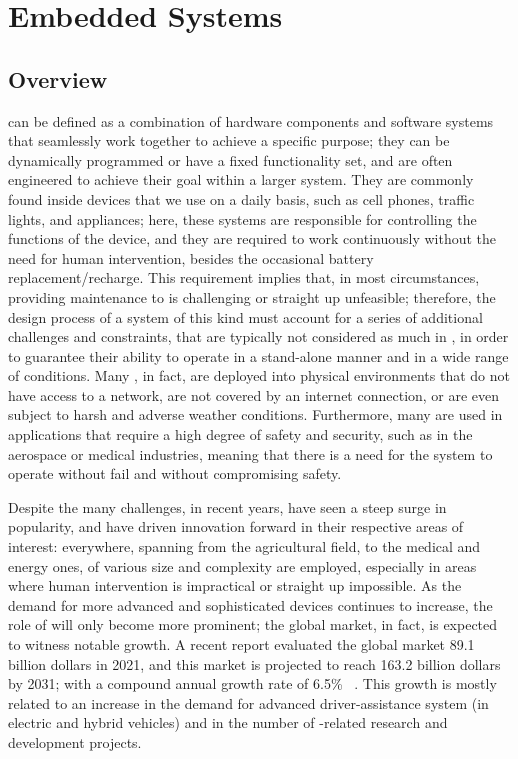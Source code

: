 \chapter{Embedded Systems}
\section{Overview}
\ess can be defined as a combination of hardware components and software systems that seamlessly work together to achieve a specific purpose; they can be dynamically programmed or have a fixed functionality set, and are often engineered to achieve their goal within a larger system. They are commonly found inside devices that we use on a daily basis, such as cell phones, traffic lights, and appliances; here, these systems are responsible for controlling the functions of the device, and they are required to work continuously without the need for human intervention, besides the occasional battery replacement/recharge.
This requirement implies that, in most circumstances, providing maintenance to \ess is challenging or straight up unfeasible; therefore, the design process of a system of this kind must account for a series of additional challenges and constraints, that are typically not considered as much in \noess, in order to guarantee their ability to operate in a stand-alone manner and in a wide range of conditions. Many \ess, in fact, are deployed into physical environments that do not have access to a network, are not covered by an internet connection, or are even subject to harsh and adverse weather conditions.
Furthermore, many \ess are used in applications that require a high degree of safety and security, such as in the aerospace or medical industries, meaning that there is a need for the system to operate without fail and without compromising safety. 

Despite the many challenges, in recent years, \ess have seen a steep surge in popularity, and have driven innovation forward in their respective areas of interest: everywhere, spanning from the agricultural field, to the medical and energy ones, \ess of various size and complexity are employed, especially in areas where human intervention is impractical or straight up impossible.
As the demand for more advanced and sophisticated devices continues to increase, the role of \ess will only become more prominent; the global \ess market, in fact, is expected to witness notable growth. A recent report evaluated the global \ess market 89.1 billion dollars in 2021, and this market is projected to reach 163.2 billion dollars by 2031; with a compound annual growth rate of  6.5\%~ \cite{ESSTR2022}. This growth is mostly related to  an increase in the demand for advanced driver-assistance system (in electric and hybrid vehicles) and in the number of \ess-related research and development projects. 





